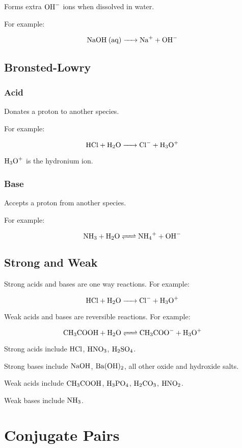 \documentclass[a4paper,11pt]{article}
\begin{document}
Forms extra $\ce{OH-}$ ions when dissolved in water.

For example:

$$
\ce{NaOH (aq) -> Na+ + OH-}
$$


\subsection{Bronsted-Lowry}

\subsubsection{Acid}

Donates a proton to another species.

For example:

$$
\ce{HCl + H2O -> Cl- + H3O+}
$$

$\ce{H3O+}$ is the hydronium ion.


\subsubsection{Base}

Accepts a proton from another species.

For example:

$$
\ce{NH3 + H2O <=> NH4+ + OH-}
$$


\subsection{Strong and Weak}

Strong acids and bases are one way reactions. For example:

$$
\ce{HCl + H2O -> Cl- + H3O+}
$$

Weak acids and bases are reversible reactions. For example:

$$
\ce{CH3COOH + H2O <=> CH3COO- + H3O+}
$$

Strong acids include $\ce{HCl}$, $\ce{HNO3}$, $\ce{H2SO4}$.

Strong bases include $\ce{NaOH}$, $\ce{Ba(OH)2}$, all other oxide and hydroxide
salts.

Weak acids include $\ce{CH3COOH}$, $\ce{H3PO4}$, $\ce{H2CO3}$, $\ce{HNO2}$.

Weak bases include $\ce{NH3}$.


\section{Conjugate Pairs}
\end{document}
